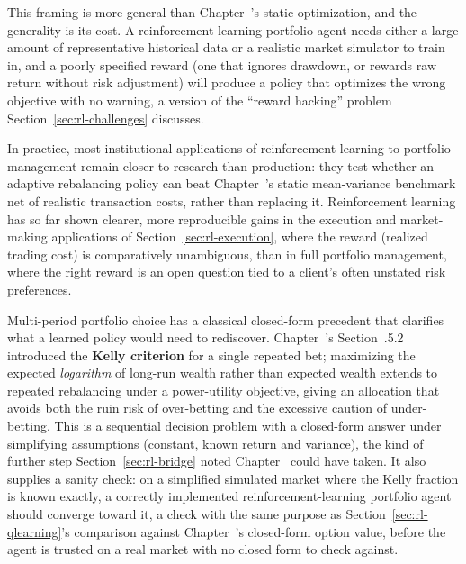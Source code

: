\documentclass[../ai_in_finance]{subfiles}
\begin{document}
This framing is more general than Chapter~'s static optimization, and the generality is its cost. A reinforcement-learning portfolio agent needs either a large amount of representative historical data or a realistic market simulator to train in, and a poorly specified reward (one that ignores drawdown, or rewards raw return without risk adjustment) will produce a policy that optimizes the wrong objective with no warning, a version of the ``reward hacking'' problem Section~\ref{sec:rl-challenges} discusses.

In practice, most institutional applications of reinforcement learning to portfolio management remain closer to research than production: they test whether an adaptive rebalancing policy can beat Chapter~'s static mean-variance benchmark net of realistic transaction costs, rather than replacing it. Reinforcement learning has so far shown clearer, more reproducible gains in the execution and market-making applications of Section~\ref{sec:rl-execution}, where the reward (realized trading cost) is comparatively unambiguous, than in full portfolio management, where the right reward is an open question tied to a client's often unstated risk preferences.

Multi-period portfolio choice has a classical closed-form precedent that clarifies what a learned policy would need to rediscover. Chapter~'s Section~.5.2 introduced the \textbf{Kelly criterion} for a single repeated bet; maximizing the expected \emph{logarithm} of long-run wealth rather than expected wealth extends to repeated rebalancing under a power-utility objective, giving an allocation that avoids both the ruin risk of over-betting and the excessive caution of under-betting. This is a sequential decision problem with a closed-form answer under simplifying assumptions (constant, known return and variance), the kind of further step Section~\ref{sec:rl-bridge} noted Chapter~ could have taken. It also supplies a sanity check: on a simplified simulated market where the Kelly fraction is known exactly, a correctly implemented reinforcement-learning portfolio agent should converge toward it, a check with the same purpose as Section~\ref{sec:rl-qlearning}'s comparison against Chapter~'s closed-form option value, before the agent is trusted on a real market with no closed form to check against.

\label{sec:rl-kelly-worked}
\end{document}
